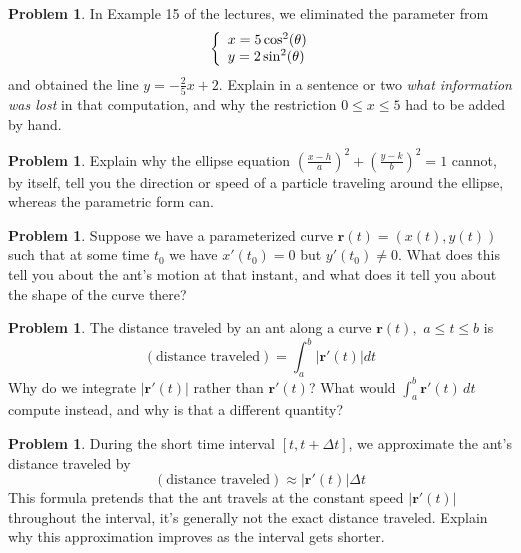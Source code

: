 \documentclass[10pt]{article}
\theoremstyle{definition}
\newtheorem{problem}[theorem]{Problem}
\newcommand{\1}[1]{\textbf{1}_{\left[#1\right]}} %
\begin{document}
\begin{problem}
  In Example 15 of the lectures, we eliminated the parameter from
  \begin{equation*}
    \left\{ \begin{array}{l@{}l} x=5\cos^{2}(\theta) \\  y=2\sin^{2}(\theta)\end{array}\right.
  \end{equation*}
  and obtained the line $y=-\frac{2}{5}x +2$. Explain in a sentence or two \emph{what
    information was lost} in that computation, and why the restriction
  $0\le x\le 5$ had to be added by hand.
  \vspace{1in}
\end{problem}
\newpage
\begin{problem}
  Explain why the ellipse equation
  $\left(\frac{x-h}{a}\right)^{2}+\left(\frac{y-k}{b}\right)^{2}=1$ cannot, by
  itself, tell you the direction or speed of a particle traveling around the
  ellipse, whereas the parametric form can.
  \vspace{1in}
\end{problem}

\begin{problem}
  Suppose we have a parameterized curve $\mathbf{r}(t)=(x(t),y(t))$ such
  that at some time $t_{0}$ we have $x'(t_{0})=0$ but $y'(t_{0})\neq0$. What
  does this tell you about the ant's motion at that instant, and what does it
  tell you about the shape of the curve there?
  \vspace{1in}
\end{problem}

\begin{problem}
  The distance traveled by an ant along a curve $\mathbf{r}(t),$ $a \leq
  t \leq b$ is
  \begin{equation*}
    (\text{distance traveled}) = \int_{a}^{b}\left|\mathbf r'(t)\right|dt
  \end{equation*}
  Why do we integrate $|\mathbf{r}'(t)|$ rather than $\mathbf{r}'(t)$? What
  would $\int_{a}^{b}\mathbf r'(t)\,dt$ compute instead, and why is that a
  different quantity?
  \vspace{1in}
\end{problem}



\begin{problem}
  During the short time interval $[t,t+\Delta t]$, we approximate the ant's distance
  traveled by 
  \[
    (\text{distance traveled})\approx
    |\mathbf r'(t)|\Delta t
  \]
  This formula pretends that the ant travels at the constant speed
  $|\mathbf r'(t)|$ throughout the interval, it's generally not the exact
  distance traveled. Explain why this approximation improves as the interval
  gets shorter. \vspace{1.2in}
\end{problem}
\end{document}

